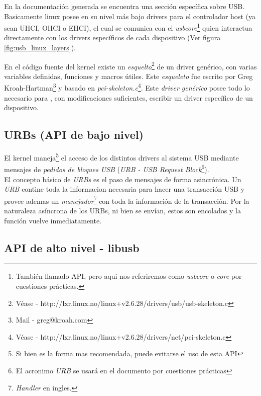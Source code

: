 En la documentaci\'on generada se encuentra una secci\'on espec\'ifica sobre
USB.\\

Basicamente linux posee en su nivel m\'as bajo drivers para el controlador
host (ya sean UHCI, OHCI o EHCI), el cual se comunica con el
\emph{usbcore}\footnote{Tambi\'en llamado API, pero aqui nos referiremos como
\emph{usbcore} o \emph{core} por cuestiones pr\'acticas.} quien interactua
directamente con los drivers espec\'ificos de cada dispositivo (Ver figura
\ref{fig:usb_linux_layers}).


En el c\'odigo fuente del kernel existe un \emph{esquelto}\footnote{V\'ease
- http://lxr.linux.no/linux+v2.6.28/drivers/usb/usb-skeleton.c} de un driver
gen\'erico, con varias variables definidas, funciones y macros \'utiles.
Este \emph{esqueleto} fue escrito por Greg Kroah-Hartman\footnote{Mail - 
greg@kroah.com} y basado en \emph{pci-skeleton.c}\footnote{V\'ease -
http://lxr.linux.no/linux+v2.6.28/drivers/net/pci-skeleton.c}.
Este \emph{driver gen\'erico} posee todo lo necesario para , con
modificaciones suficientes, escribir un driver espec\'ifico de un dispositivo.

\subsection{URBs (API de bajo nivel)}

El kernel maneja\footnote{Si bien es la forma mas recomendada, puede evitarse
el uso de esta API} el acceso de los distintos drivers al sistema USB mediante
mensajes de \emph{pedidos de bloques USB} (\emph{URB - USB Request
Block}\footnote{El acronimo \emph{URB} se usar\'a en el documento por
cuestiones pr\'acticas}).\\

El concepto b\'asico de \emph{URBs} es el paso de mensajes de forma
asincr\'onica. 
Un \emph{URB} contine toda la informacion necesaria para hacer una
transacci\'on USB y provee ademas un \emph{manejador}\footnote{\emph{Handler}
en ingles.} con toda la informaci\'on de la transacci\'on.
Por la naturaleza as\'incrona de los URBs, ni bien se env\'ian, estos son
encolados y la funci\'on vuelve inmediatamente. 



\subsection{API de alto nivel - libusb}


